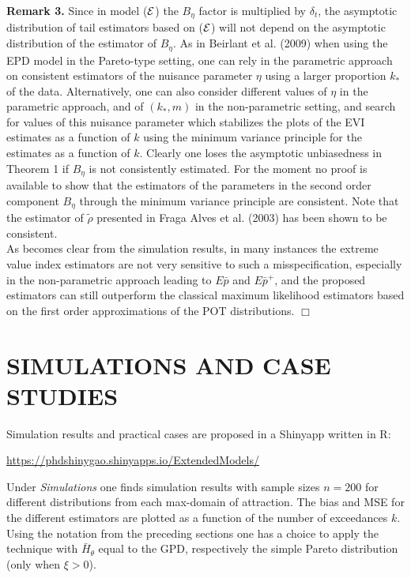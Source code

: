\documentclass[twoside,leqno,11pt]{article}
\begin{document}
\noindent
{\bf Remark 3.} Since in model (${\cal{E}}$) the $B_{\eta}$ factor is multiplied by $\delta_t$, the asymptotic distribution of tail estimators based on (${\cal{E}}$) will not depend on the asymptotic distribution of the estimator of $B_{\eta}$. As in Beirlant et al. (2009) when using the EPD model in the Pareto-type setting,  one can rely in the parametric approach on consistent estimators of the nuisance parameter $\eta$  using a larger proportion $k_*$ of the data.
 Alternatively, one can also consider different values of $\eta$ in the parametric approach, and of $(k_*,m)$ in the non-parametric setting, and search for values of this nuisance parameter which stabilizes the plots of the EVI estimates as a function of $k$ using the minimum variance principle for the estimates as a function of $k$. Clearly one loses the asymptotic unbiasedness in Theorem 1 if $B_{\eta}$ is not consistently estimated. For the moment no proof is available to show that the estimators of the parameters in the second order component $B_{\eta}$ through the minimum variance principle are consistent.
 Note that the estimator of $\tilde\rho$ presented in Fraga Alves et al. (2003) has been shown to be consistent.
 \\
 As becomes clear from the simulation results, in many instances the extreme value index estimators are not very sensitive to such a misspecification, especially in the non-parametric approach leading to $E\bar{p}$
and $E\bar{p}^+$, and the proposed estimators can still outperform the classical maximum likelihood estimators based on the first order approximations of the POT distributions.   $\Box$


 \section{SIMULATIONS AND CASE STUDIES}
Simulation results and practical cases  are proposed in a Shinyapp written in R:
\begin{center} 
  \url{https://phdshinygao.shinyapps.io/ExtendedModels/}
  \end{center}
  Under {\it Simulations} one finds simulation results with sample sizes $n= 200$ for different distributions from each max-domain of attraction. The bias and MSE for the different estimators are plotted as a function of the number of  exceedances $k$. 
  Using the notation from the preceding sections one has a choice to apply the technique with $\bar{H}_{\theta}$ equal to the GPD, respectively the simple Pareto distribution (only when $\xi>0$). \\
\end{document}
